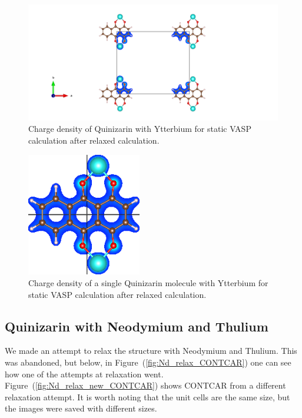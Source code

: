 \documentclass{article}
\begin{document}
      \begin{figure}[H]
          \centering
          \includegraphics[width = \textwidth]{../fig/Yb_staticafter_CHGCAR.png}
          \caption{Charge density of Quinizarin with Ytterbium for static VASP calculation after relaxed calculation. }
          \label{fig:Yb_staticafter_CHGCAR}
      \end{figure}

      \begin{figure}[H]
        \centering
        \includegraphics[width = 5cm]{../fig/Yb_staticafter_CHGDENSITY.png}
        \caption{Charge density of a single Quinizarin molecule with Ytterbium for static VASP calculation after relaxed calculation. }
        \label{fig:Yb_staticafter_CHGDENSITY}
      \end{figure}

      \vspace{1cm}

  \subsection{Quinizarin with Neodymium and Thulium}

    We made an attempt to relax the structure with Neodymium and Thulium. This was abandoned, but below, in Figure~(\ref{fig:Nd_relax_CONTCAR}) one can see how one of the attempts at relaxation went. Figure~(\ref{fig:Nd_relax_new_CONTCAR}) shows CONTCAR from a different relaxation attempt. It is worth noting that the unit cells are the same size, but the images were saved with different sizes. \\
\end{document}
